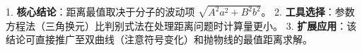 \begin{summarybox}
1. \textbf{核心结论}：距离最值取决于分子的波动项 $\sqrt{A^2a^2 + B^2b^2}$。
2. \textbf{工具选择}：参数方程法（三角换元）比判别式法在处理距离问题时计算量更小。
3. \textbf{扩展应用}：该结论可直接推广至双曲线（注意符号变化）和抛物线的最值距离求解。
\end{summarybox}
